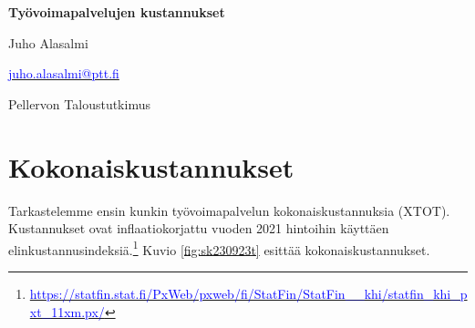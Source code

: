 \documentclass[12pt]{article}
\begin{document}
\noindent \textbf{Työvoimapalvelujen kustannukset} \par
\vspace{0.5cm}

\noindent Juho Alasalmi{\par}
\noindent \href{mailto: juho.alasalmi@ptt.fi}{\textcolor{blue}{juho.alasalmi@ptt.fi}}{\par}
\noindent Pellervon Taloustutkimus {\par}

\vspace{0.5cm}

\section{Kokonaiskustannukset}

Tarkastelemme ensin kunkin työvoimapalvelun kokonaiskustannuksia (XTOT). Kustannukset ovat inflaatiokorjattu vuoden 2021 hintoihin käyttäen elinkustannusindeksiä.\footnote{\href{https://statfin.stat.fi/PxWeb/pxweb/fi/StatFin/StatFin__khi/statfin_khi_pxt_11xm.px/}{\textcolor{blue}{https://statfin.stat.fi/PxWeb/pxweb/fi/StatFin/StatFin\_\_khi/statfin\_khi\_pxt\_11xm.px/}}} Kuvio \ref{fig:sk230923t} esittää kokonaiskustannukset.
\end{document}
